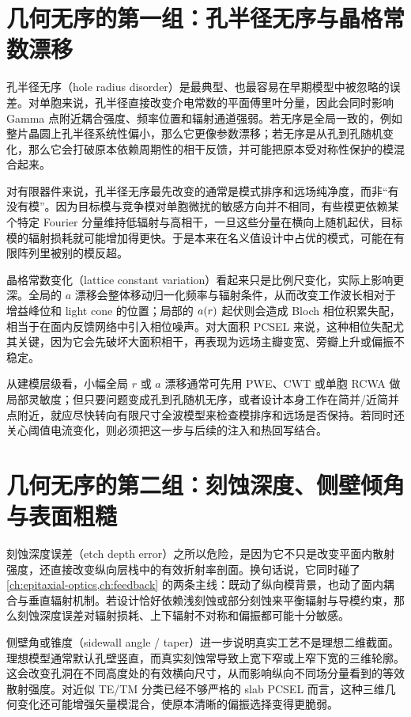 \section{几何无序的第一组：孔半径无序与晶格常数漂移}
孔半径无序（hole radius disorder）是最典型、也最容易在早期模型中被忽略的误差。对单胞来说，孔半径直接改变介电常数的平面傅里叶分量，因此会同时影响 Gamma 点附近耦合强度、频率位置和辐射通道强弱。若无序是全局一致的，例如整片晶圆上孔半径系统性偏小，那么它更像参数漂移；若无序是从孔到孔随机变化，那么它会打破原本依赖周期性的相干反馈，并可能把原本受对称性保护的模混合起来。

对有限器件来说，孔半径无序最先改变的通常是模式排序和远场纯净度，而非“有没有模”。因为目标模与竞争模对单胞微扰的敏感方向并不相同，有些模更依赖某个特定 Fourier 分量维持低辐射与高相干，一旦这些分量在横向上随机起伏，目标模的辐射损耗就可能增加得更快。于是本来在名义值设计中占优的模式，可能在有限阵列里被别的模反超。

晶格常数变化（lattice constant variation）看起来只是比例尺变化，实际上影响更深。全局的 $a$ 漂移会整体移动归一化频率与辐射条件，从而改变工作波长相对于增益峰位和 light cone 的位置；局部的 $a(r)$ 起伏则会造成 Bloch 相位积累失配，相当于在面内反馈网络中引入相位噪声。对大面积 PCSEL 来说，这种相位失配尤其关键，因为它会先破坏大面积相干，再表现为远场主瓣变宽、旁瓣上升或偏振不稳定。

从建模层级看，小幅全局 $r$ 或 $a$ 漂移通常可先用 PWE、CWT 或单胞 RCWA 做局部灵敏度；但只要问题变成孔到孔随机无序，或者设计本身工作在简并/近简并点附近，就应尽快转向有限尺寸全波模型来检查模排序和远场是否保持。若同时还关心阈值电流变化，则必须把这一步与后续的注入和热回写结合。

\section{几何无序的第二组：刻蚀深度、侧壁倾角与表面粗糙}
刻蚀深度误差（etch depth error）之所以危险，是因为它不只是改变平面内散射强度，还直接改变纵向层栈中的有效折射率剖面。换句话说，它同时碰了 \cref{ch:epitaxial-optics,ch:feedback} 的两条主线：既动了纵向模背景，也动了面内耦合与垂直辐射机制。若设计恰好依赖浅刻蚀或部分刻蚀来平衡辐射与导模约束，那么刻蚀深度误差对辐射损耗、上下辐射不对称和偏振都可能十分敏感。

侧壁角或锥度（sidewall angle / taper）进一步说明真实工艺不是理想二维截面。理想模型通常默认孔壁竖直，而真实刻蚀常导致上宽下窄或上窄下宽的三维轮廓。这会改变孔洞在不同高度处的有效横向尺寸，从而影响纵向不同场分量看到的等效散射强度。对近似 TE/TM 分类已经不够严格的 slab PCSEL 而言，这种三维几何变化还可能增强矢量模混合，使原本清晰的偏振选择变得更脆弱。

